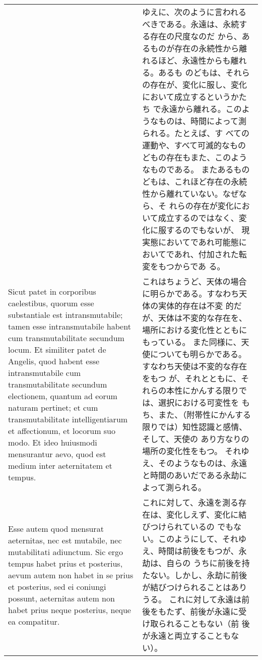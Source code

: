 \documentclass[10pt]{jsarticle} %
\begin{document}
\begin{longtable}{p{21em}p{21em}}
&

ゆえに、次のように言われるべきである。永遠は、永続する存在の尺度なのだ
から、あるものが存在の永続性から離れるほど、永遠性からも離れる。あるも
のどもは、それらの存在が、変化に服し、変化において成立するというかたち
で永遠から離れる。このようなものは、時間によって測られる。たとえば、す
べての運動や、すべて可滅的なものどもの存在もまた、このようなものである。
またあるものどもは、これほど存在の永続性から離れていない。なぜなら、そ
れらの存在が変化において成立するのではなく、変化に服するのでもないが、
現実態においてであれ可能態においてであれ、付加された転変をもつからであ
る。


\\


Sicut patet in corporibus
caelestibus, quorum esse substantiale est intransmutabile; tamen esse
intransmutabile habent cum transmutabilitate secundum locum. Et
similiter patet de Angelis, quod habent esse intransmutabile cum
transmutabilitate secundum electionem, quantum ad eorum naturam
pertinet; et cum transmutabilitate intelligentiarum et affectionum, et
locorum suo modo. Et ideo huiusmodi mensurantur aevo, quod est medium
inter aeternitatem et tempus.

&

これはちょうど、天体の場合に明らかである。すなわち天体の実体的存在は不変
 的だが、天体は不変的な存在を、場所における変化性とともにもっている。
また同様に、天使についても明らかである。すなわち天使は不変的な存在をもつ
 が、それとともに、それらの本性にかんする限りでは、選択における可変性を
 もち、また、（附帯性にかんする限りでは）知性認識と感情、そして、天使の
 あり方なりの場所の変化性をもつ。
それゆえ、そのようなものは、永遠と時間のあいだである永劫によって測られる。

\\

Esse autem quod mensurat aeternitas, nec
est mutabile, nec mutabilitati adiunctum. Sic ergo tempus habet prius et
posterius, aevum autem non habet in se prius et posterius, sed ei
coniungi possunt, aeternitas autem non habet prius neque posterius,
neque ea compatitur.
&

これに対して、永遠を測る存在は、変化しえず、変化に結びつけられているの
でもない。このようにして、それゆえ、時間は前後をもつが、永劫は、自らの
うちに前後を持たない。しかし、永劫に前後が結びつけられることはありうる。
これに対して永遠は前後をもたず、前後が永遠に受け取られることもない（前
後が永遠と両立することもない）。

\\


\end{longtable}
\end{document}
